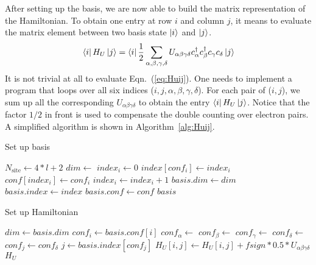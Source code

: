 After setting up the basis, we are now able to build the matrix representation of the Hamiltonian.
To obtain one entry at row $i$ and column $j$, it means to evaluate the matrix
element between two basis state $\Ket{i}$ and $\Ket{j}$.
\begin{equation} \label{eq:Huij}
\Bra{i} H_U \Ket{j} = 
\Bra{i} \frac{1}{2} \sum_{\alpha,\beta,\gamma,\delta} U_{\alpha\beta\gamma\delta} c_\alpha^\dag c_\beta^\dag c_\gamma c_\delta \Ket{j}
\end{equation}
%
It is not trivial at all to evaluate Eqn.~(\ref{eq:Huij}). One needs to implement a program
that loops over all six indices ($i,j,\alpha,\beta,\gamma,\delta$). For each pair of ($i,j$),
we sum up all the corresponding $U_{\alpha\beta\gamma\delta}$ to obtain the entry $\Bra{i}H_U\Ket{j}$.
Notice that the factor $1/2$ in front is used to compensate the double counting over
electron pairs. A simplified algorithm is shown in Algorithm~\ref{alg:Huij}.

\begin{algorithm}[h!]
\caption{Set up basis}\label{alg:basis}
\begin{algorithmic}[1]
\State $N_{\text{site}} \gets 4*l+2$
\State $dim \gets$ 
\State $index_i \gets 0$
\State $index[conf_i] \gets index_i$
\State $conf[index_i] \gets conf_i$
\State $index_i \gets index_i + 1$
\EndIf
\EndFor
\State $basis.dim \gets dim$
\State $basis.index \gets index$
\State $basis.conf \gets conf$
\State \Return $basis$
\EndFunction
\end{algorithmic}
\end{algorithm}

\begin{algorithm}[h!]
\caption{Set up Hamiltonian}\label{alg:Huij}
\begin{algorithmic}[1]
\State $dim \gets basis.dim$
\State $conf_i \gets basis.conf[i]$
\ForAll {$\alpha$}
\State $conf_\alpha \gets$ 
\ForAll {$\beta$}
\State $conf_\beta \gets$ 
\ForAll {$\gamma$}
\State $conf_\gamma \gets$ 
\ForAll {$\delta$}
\State $conf_\delta \gets$ 
\State $conf_j \gets conf_\delta$
\State $j \gets basis.index[conf_j]$
\State $H_U[i,j] \gets H_U[i,j] + fsign*0.5*U_{\alpha\beta\gamma\delta}$
\EndIf
\EndFor
\EndIf
\EndFor
\EndIf
\EndFor
\EndIf
\EndFor
\EndFor
\State \Return $H_U$
\EndFunction
\end{algorithmic}
\end{algorithm}

